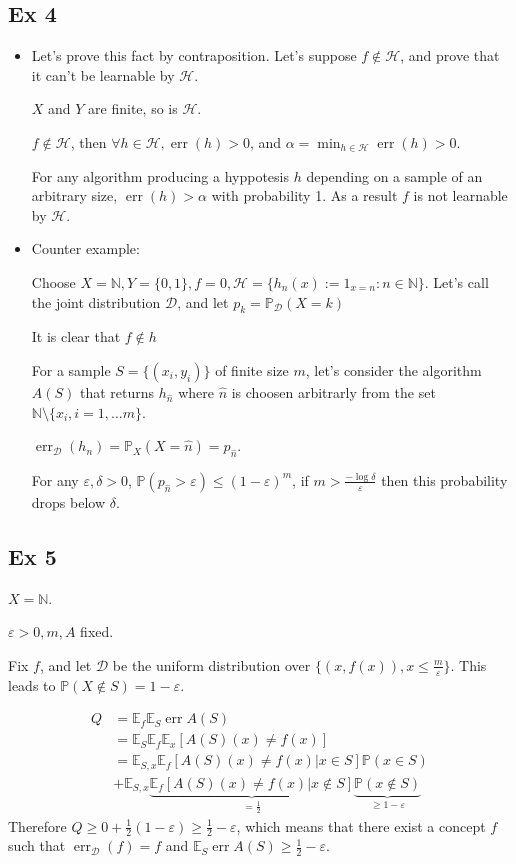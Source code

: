 \documentclass[12pt]{article}
\newcommand{\Q}[1]{\subsection*{Ex #1}}
\newenvironment{question}[1]
{\Q{#1}}{}
\newcommand{\esp}{{\mathbb E}}
\newcommand{\pr}{{\mathbb P}}
\DeclareMathOperator{\err}{err}
\begin{document}
\begin{question}{4}
\begin{itemize}
\item
  Let's prove this fact by contraposition. Let's suppose $f \not \in \mathcal H$, and prove that it can't be learnable by $\mathcal H$.
  
  $X$ and $Y$ are finite, so is $\mathcal H$.
  
  $f \not \in \mathcal H$, then $\forall h \in \mathcal H, \err(h) > 0$, and $\alpha = \min_{h \in \mathcal H} \err(h) > 0$.

  For any algorithm producing a hyppotesis $h$ depending on a sample of an arbitrary size, $\err(h) > \alpha$ with probability 1.
  As a result $f$ is not learnable by $\mathcal H$.
  
\item
  Counter example:
  
  Choose $X = \mathbb N, Y = \{0, 1\}, f = 0, \mathcal H = \{ h_n(x) := 1_{x = n} : n \in \mathbb N \}$.
  Let's call the joint distribution $\mathcal D$, and let $p_k = \pr_{\mathcal D}(X = k)$
  
  It is clear that $f \not \in h$

  For a sample $S = \{ (x_i, y_i) \}$ of finite size $m$, let's consider the algorithm $A(S)$ that returns $h_{\hat n}$ where $\hat n$ is choosen arbitrarly from the set $\mathbb N \setminus \{ x_i, i = 1, \ldots m \}$.
  
  $\err_{\mathcal D}(h_n) = \pr_{X}(X = \hat n) = p_{\hat n}$.

  For any $\varepsilon, \delta > 0$, $\mathbb{P}( p_{\hat n} > \varepsilon ) \le (1 - \varepsilon)^m$, if $m > \frac{-\log \delta} \varepsilon$ then this probability drops below $\delta$.

\end{itemize}
\end{question}
\begin{question}{5}

$X = \mathbb N$.

$\varepsilon > 0, m, A$ fixed.

Fix $f$, and let $\mathcal D$ be the uniform distribution over $\{(x, f(x)), x \le \frac m \varepsilon\}$. This leads to $\pr(X \not \in S) = 1 - \varepsilon$.

\begin{align*}
  Q &= \esp_f  \esp_S \err A(S)
  \\&= \esp_S \esp_f  \esp_x  [A(S)(x) \ne f(x)]
  \\&= \esp_{S,x} \esp_f    [A(S)(x) \ne f(x) | x \in S] \mathbb{P}(x \in S)
  \\&+ \esp_{S,x} \underbrace{\esp_f  [A(S)(x) \ne f(x) | x \not \in S]}_{= \frac12} \underbrace{\mathbb{P}(x \not \in S)}_{\ge 1 - \varepsilon}
\end{align*}
Therefore $Q \ge 0 + \frac12 (1 - \varepsilon) \ge \frac12 - \varepsilon$, which means that there exist a concept $f$ such that
$\err_{\mathcal D}(f) = f$ and $\esp_S \err A(S) \ge \frac12 - \varepsilon$.

\end{question}
\end{document}
